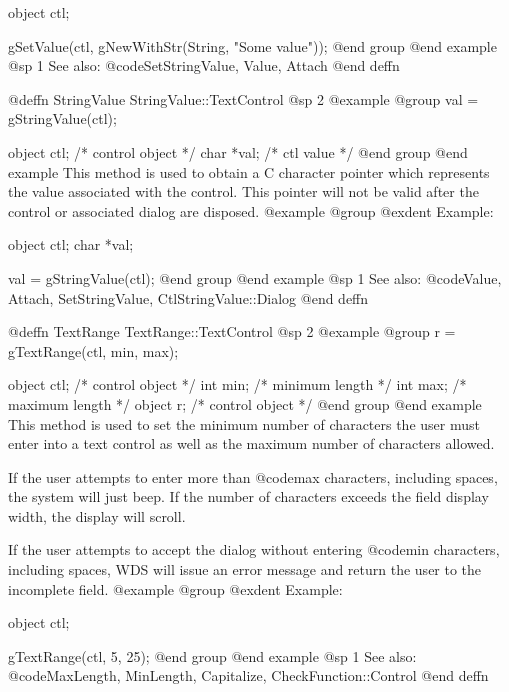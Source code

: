 object  ctl;

gSetValue(ctl, gNewWithStr(String, "Some value"));
@end group
@end example
@sp 1
See also:  @code{SetStringValue, Value, Attach}
@end deffn









@deffn {StringValue} StringValue::TextControl
@sp 2
@example
@group
val = gStringValue(ctl);

object  ctl;   /*  control object  */
char    *val;  /*  ctl value       */
@end group
@end example
This method is used to obtain a C character pointer which represents the
value associated with the control.  This pointer will not be valid
after the control or associated dialog are disposed.
@example
@group
@exdent Example:

object  ctl;
char    *val;

val = gStringValue(ctl);
@end group
@end example
@sp 1
See also:  @code{Value, Attach, SetStringValue, CtlStringValue::Dialog}
@end deffn














@deffn {TextRange} TextRange::TextControl
@sp 2
@example
@group
r = gTextRange(ctl, min, max);

object  ctl;   /*  control object  */
int     min;   /*  minimum length  */
int     max;   /*  maximum length  */
object  r;     /*  control object  */
@end group
@end example
This method is used to set the minimum number of characters the user must
enter into a text control as well as the maximum number of characters
allowed.

If the user attempts to enter more than @code{max} characters, including
spaces, the system will just beep.  If the number of characters exceeds
the field display width, the display will scroll.

If the user attempts to accept the dialog without entering @code{min}
characters, including spaces, WDS will issue an error message and return
the user to the incomplete field.
@example
@group
@exdent Example:

object  ctl;

gTextRange(ctl, 5, 25);
@end group
@end example
@sp 1
See also:  @code{MaxLength, MinLength, Capitalize, CheckFunction::Control}
@end deffn











